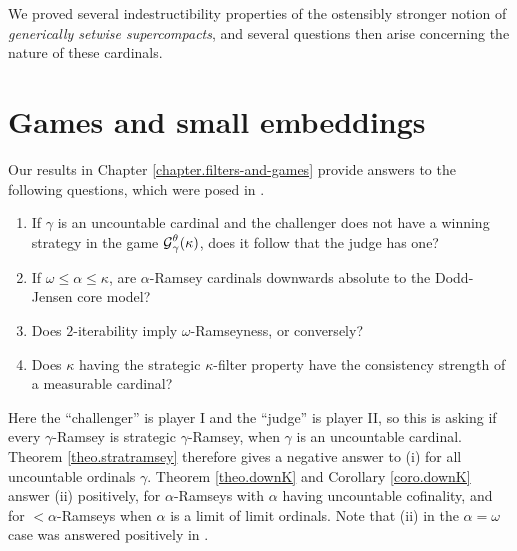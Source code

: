 \documentclass[../../main]{subfiles}
\begin{document}
We proved several indestructibility properties of the ostensibly stronger notion of \textit{generically setwise supercompacts}, and several questions then arise concerning the nature of these cardinals.






\section{Games and small embeddings}

Our results in Chapter \ref{chapter.filters-and-games} provide answers to the following questions, which were posed in \cite{HolySchlicht}.

\begin{enumerate}
	\item If $\gamma$ is an uncountable cardinal and the challenger does not have a winning strategy in the game $\operatorname{\mathcal G}_\gamma^\theta(\kappa)$, does it follow that the judge has one?
	\item If $\omega\leq\alpha\leq\kappa$, are $\alpha$-Ramsey cardinals downwards absolute to the Dodd-Jensen core model?
	\item Does $2$-iterability imply $\omega$-Ramseyness, or conversely?
	\item Does $\kappa$ having the strategic $\kappa$-filter property have the consistency strength of a measurable cardinal?\\
\end{enumerate}

Here the ``challenger'' is player I and the ``judge'' is player II, so this is asking if every $\gamma$-Ramsey is strategic $\gamma$-Ramsey, when $\gamma$ is an uncountable cardinal. Theorem \ref{theo.stratramsey} therefore gives a negative answer to (i) for all uncountable ordinals $\gamma$. Theorem \ref{theo.downK} and Corollary \ref{coro.downK} answer (ii) positively, for $\alpha$-Ramseys with $\alpha$ having uncountable cofinality, and for ${<}\alpha$-Ramseys when $\alpha$ is a limit of limit ordinals. Note that (ii) in the $\alpha=\omega$ case was answered positively in \cite{HolySchlicht}.
\end{document}

